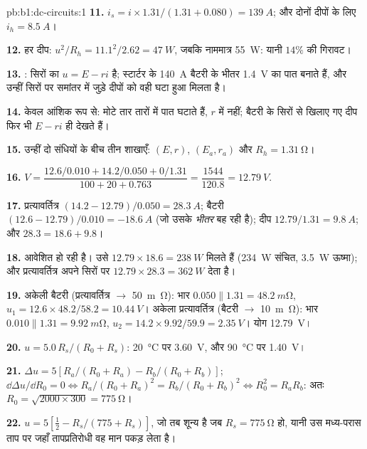 \begin{solution}{pb:b1:dc-circuits:1}
\textbf{11.} $i_s = i \times 1.31/(1.31 + 0.080) = \qty{139}{A}$; और दोनों दीपों के लिए $i_h =
\qty{8.5}{A}$।

\textbf{12.} हर दीप: $u^2/R_h = 11.1^2/2.62 = \qty{47}{W}$, जबकि नाममात्र
\qty{55}{W}: यानी $14\%$ की गिरावट।

\textbf{13.} : सिरों का  $u = E - ri$ है; स्टार्टर के
\qty{140}{A} बैटरी के भीतर \qty{1.4}{V} का पात बनाते हैं, और उन्हीं सिरों पर
समांतर में जुड़े दीपों को वही घटा हुआ  मिलता है।

\textbf{14.} केवल आंशिक रूप से: मोटे तार तारों में पात घटाते हैं, $r$ में
नहीं; बैटरी के सिरों से खिलाए गए दीप फिर भी $E - ri$ ही देखते हैं।

\textbf{15.} उन्हीं दो संधियों के बीच तीन शाखाएँ: $(E, r)$,
$(E_a, r_a)$ और $R_h = \qty{1.31}{\ohm}$।

\textbf{16.} $V = \dfrac{12.6/0.010 + 14.2/0.050 + 0/1.31}{100 + 20 + 0.763}
= \dfrac{1544}{120.8} = \qty{12.79}{V}$.

\textbf{17.} प्रत्यावर्तित्र $(14.2 - 12.79)/0.050 = \qty{28.3}{A}$; बैटरी
$(12.6 - 12.79)/0.010 = \qty{-18.6}{A}$ (जो उसके \emph{भीतर} बह रही है); दीप
$12.79/1.31 = \qty{9.8}{A}$; और $28.3 = 18.6 + 9.8$।

\textbf{18.} आवेशित हो रही है। उसे $12.79 \times 18.6 = \qty{238}{W}$ मिलते
हैं (\qty{234}{W} संचित, \qty{3.5}{W} ऊष्मा); और प्रत्यावर्तित्र अपने सिरों पर
$12.79 \times 28.3 = \qty{362}{W}$ देता है।

\textbf{19.} अकेली बैटरी (प्रत्यावर्तित्र $\to$ \qty{50}{m\ohm}): भार
$0.050 \parallel 1.31 = \qty{48.2}{m\ohm}$, $u_1 = 12.6 \times 48.2/58.2 =
\qty{10.44}{V}$। अकेला प्रत्यावर्तित्र (बैटरी $\to$ \qty{10}{m\ohm}): भार
$0.010 \parallel 1.31 = \qty{9.92}{m\ohm}$, $u_2 = 14.2 \times 9.92/59.9 =
\qty{2.35}{V}$। योग \qty{12.79}{V}।

\textbf{20.} $u = 5.0\,R_s/(R_0 + R_s)$: \qty{20}{\degreeCelsius} पर
\qty{3.60}{V}, और \qty{90}{\degreeCelsius} पर \qty{1.40}{V}।

\textbf{21.} $\Delta u = 5[R_a/(R_0 + R_a) - R_b/(R_0 + R_b)]$;
$\dd\Delta u/\dd R_0 = 0 \Leftrightarrow R_a/(R_0 + R_a)^2 = R_b/(R_0 +
R_b)^2 \Leftrightarrow R_0^2 = R_aR_b$: अतः $R_0 = \sqrt{2000 \times 300} =
\qty{775}{\ohm}$।

\textbf{22.} $u = 5[\tfrac12 - R_s/(775 + R_s)]$, जो तब शून्य है जब $R_s =
\qty{775}{\ohm}$ हो, यानी उस मध्य-परास ताप पर जहाँ तापप्रतिरोधी वह मान
पकड़ लेता है।


\end{solution}

